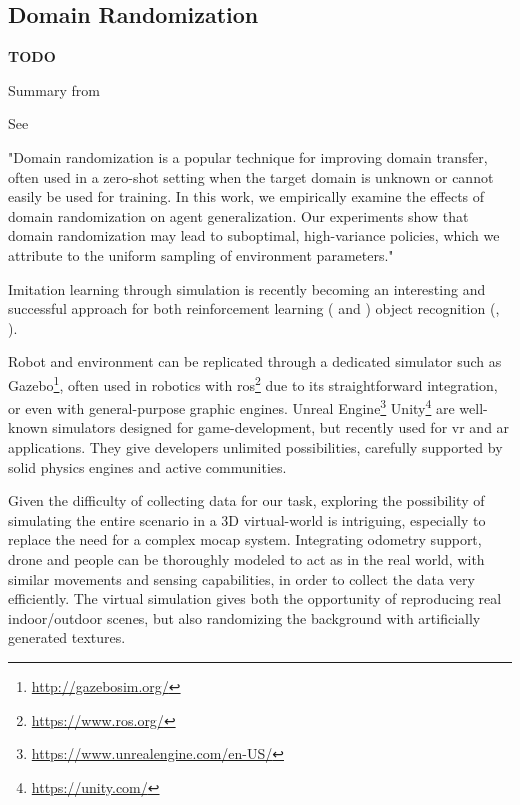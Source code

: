 \subsection{Domain Randomization}
\label{subsec:domain-randomization}

\textbf{TODO}

Summary from \cite{mehta2019active}

See \cite{weng2019DR_explanation}
 
"Domain randomization is a popular technique for improving domain transfer, often used in a zero-shot setting when the target domain is unknown or cannot easily be used for training. In this work, we empirically examine the effects of domain randomization on agent generalization. Our experiments show that domain randomization may lead to suboptimal, high-variance policies, which we attribute to the uniform sampling of environment parameters."

\medskip

Imitation learning through simulation is recently becoming an interesting and successful approach for both reinforcement learning (\cite{imitation_learning_survey} and \cite{imitation_learning_3d_navigation}) object recognition (\cite{tobin2017domain}, \cite{weng2019DR}).

Robot and environment can be replicated through a dedicated simulator such as Gazebo\footnote{\url{http://gazebosim.org/}}, often used in robotics with \gls{ros}\footnote{\url{https://www.ros.org/}} due to its straightforward integration, or even with general-purpose graphic engines. Unreal Engine\footnote{\url{https://www.unrealengine.com/en-US/}} Unity\footnote{\url{https://unity.com/}} are well-known simulators designed for game-development, but recently used for \gls{vr} and \gls{ar} applications. They give developers unlimited possibilities, carefully supported by solid physics engines and active communities.

\medskip

Given the difficulty of collecting data for our task, exploring the possibility of simulating the entire scenario in a 3D virtual-world is intriguing, especially to replace the need for a complex \gls{mocap} system. Integrating odometry support, drone and people can be thoroughly modeled to act as in the real world, with similar movements and sensing capabilities, in order to collect the data very efficiently. The virtual simulation gives both the opportunity of reproducing real indoor/outdoor scenes, but also randomizing the background with artificially generated textures.

